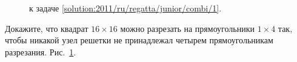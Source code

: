 \ifsolution
\begin{figure}\centering
    \caption{к задаче \ref{solution:2011/ru/regatta/junior/combi/1}.}
    \label{fig:solution:2011/ru/regatta/junior/combi/1}
\end{figure}
\fi %

\problem
Докажите, что квадрат $16 \times 16$ можно разрезать на прямоугольники
$1 \times 4$ так, чтобы никакой узел решетки не принадлежал четырем
прямоугольникам разрезания.
\solution
\label{solution:2011/ru/regatta/junior/combi/1}%
Рис.~\ref{fig:solution:2011/ru/regatta/junior/combi/1}.
\endproblem
